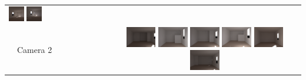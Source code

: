 \documentclass[landscape,20pt]{sciposter}
\begin{document}
\begin{minipage}[t]{17in}
\begin{tabular}{lc}
  \includegraphics[width=0.158\textwidth]{../gi2012_userstudy/images/renderings/no_renovations/user_085_camera_chris_march.png}
  \includegraphics[width=0.158\textwidth]{../gi2012_userstudy/images/renderings/renovations/user_046_camera_chris_march.png}
\\
\begin{sideways}~~Camera 2\end{sideways}&
  \includegraphics[width=0.158\textwidth]{../gi2012_userstudy/images/renderings/renovations/063_camera_dark_march_crop.png}
  \includegraphics[width=0.158\textwidth]{../gi2012_userstudy/images/renderings/renovations/050_camera_dark_march_crop.png}
  \includegraphics[width=0.158\textwidth]{../gi2012_userstudy/images/renderings/no_renovations/070_camera_dark_march_crop.png}
  \includegraphics[width=0.158\textwidth]{../gi2012_userstudy/images/renderings/renovations/098_camera_dark_march_crop.png}
  \includegraphics[width=0.158\textwidth]{../gi2012_userstudy/images/renderings/no_renovations/user_085_camera_dark_march_crop.png}
  \includegraphics[width=0.158\textwidth]{../gi2012_userstudy/images/renderings/renovations/user_046_camera_dark_march_crop.png}
\end{tabular}
\\ 


\end{minipage}
\end{document}
